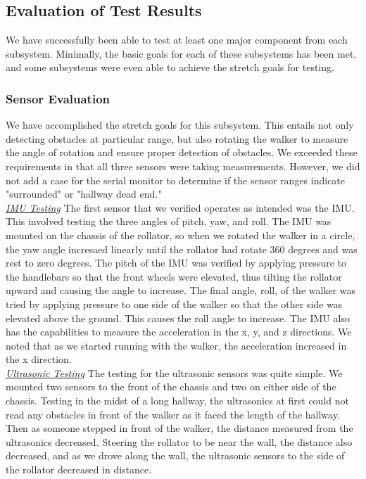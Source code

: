 \subsection{Evaluation of Test Results}
\noindent We have successfully been able to test at least one major component from each subsystem. Minimally, the basic goals for each of these subsystems has been met, and some subsystems were even able to achieve the stretch goals for testing.

\subsubsection{Sensor Evaluation}
\noindent We have accomplished the stretch goals for this subsystem. This entails not only detecting obstacles at particular range, but also rotating the walker to measure the angle of rotation and ensure proper detection of obstacles. We exceeded these requirements in that all three sensors were taking measurements. However, we did not add a case for the serial monitor to determine if the sensor ranges indicate "surrounded" or "hallway dead end."\\

\noindent \underline{\textit{IMU Testing}} \noindent The first sensor that we verified operates as intended was the IMU. This involved testing the three angles of pitch, yaw, and roll. The IMU was mounted on the chassis of the rollator, so when we rotated the walker in a circle, the yaw angle incresaed linearly until the rollator had rotate 360 degrees and was rest to zero degrees. The pitch of the IMU was verified by applying pressure to the handlebars so that the front wheels were elevated, thus tilting the rollator upward and causing the angle to increase. The final angle, roll, of the walker was tried by applying pressure to one side of the walker so that the other side was elevated above the ground. This causes the roll angle to increase. The IMU also has the capabilities to measure the acceleration in the x, y, and z directions. We noted that as we started running with the walker, the acceleration increased in the x direction.\\

\noindent \underline{\textit{Ultrasonic Testing}}
\noindent The testing for the ultrasonic sensors was quite simple. We mounted two sensors to the front of the chassis and two on either side of the chassis. Testing in the midst of a long hallway, the ultrasonics at first could not read any obstacles in front of the walker as it faced the length of the hallway. Then as someone stepped in front of the walker, the distance measured from the ultrasonics decreased. Steering the rollator to be near the wall, the distance also decreased, and as we drove along the wall, the ultrasonic sensors to the side of the rollator decreased in distance.\\

